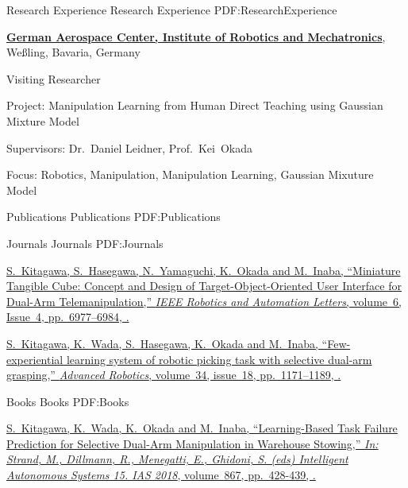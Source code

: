 \documentclass[letterpaper,MMMyyyy,nonstopmode]{simpleresumecv}
\begin{document}
\begin{Body}

\Section
{Research Experience}
{Research Experience}
{PDF:ResearchExperience}

\Gap
\Entry
\href{https://www.dlr.de/EN/Home/home_node.html}
{\textbf{German Aerospace Center, Institute of Robotics and Mechatronics}},
Weßling, Bavaria, Germany 
\Gap

\Gap
Visiting Researcher
\hfill
{}
\begin{Detail}
\par
Project:
Manipulation Learning from Human Direct Teaching using Gaussian Mixture Model
\par
Supervisors:
Dr.~Daniel Leidner,
Prof.~Kei~Okada
\par
Focus:
Robotics, Manipulation, Manipulation Learning, Gaussian Mixuture Model
\end{Detail}
\Gap


\Section
{Publications}
{Publications}
{PDF:Publications}

\SubSection
{Journals}
{Journals}
{PDF:Journals}

\begingroup

\BulletItem
\href{https://doi.org/10.1109/LRA.2021.3096475}
{\underline{S.~Kitagawa}, S.~Hasegawa, N.~Yamaguchi, K.~Okada and M.~Inaba,
``Miniature Tangible Cube: Concept and Design of Target-Object-Oriented User Interface for Dual-Arm Telemanipulation,''
\textit{IEEE Robotics and Automation Letters},
volume~6,
Issue~4,
pp.~6977--6984,
.}

\Gap
\BulletItem
\href{https://doi.org/10.1080/01691864.2020.1783352}
{\underline{S.~Kitagawa}, K.~Wada, S.~Hasegawa, K.~Okada and M.~Inaba,
``Few-experiential learning system of robotic picking task with selective dual-arm grasping,''
\textit{Advanced Robotics},
volume~34,
issue~18,
pp.~1171--1189,
.}

\endgroup

\BigGap
\SubSection
{Books}
{Books}
{PDF:Books}

\begingroup

\BulletItem
\href{https://doi.org/10.1007/978-3-030-01370-7_34}
{\underline{S.~Kitagawa}, K.~Wada, K.~Okada and M.~Inaba,
``Learning-Based Task Failure Prediction for Selective Dual-Arm Manipulation in Warehouse Stowing,''
\textit{In: Strand, M., Dillmann, R., Menegatti, E., Ghidoni, S. (eds) Intelligent Autonomous Systems 15. IAS 2018},
volume~867,
pp.~428-439,
.}


\end{Body}
\end{document}
